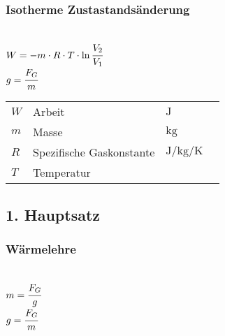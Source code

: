 \documentclass[a4paper, 11pt]{article}
\begin{document}
\subsubsection{Isotherme Zustastandsänderung}
\begin{minipage}{0.45\textwidth}

 \\
$W = -m \cdot R \cdot T \cdot \ln{\cfrac{V_2}{V_1}}$ \\
$g = \cfrac{F_G}{m}$

\end{minipage}
\begin{minipage}{0.45\textwidth}

\begin{tabular}{llll}
$W$ & Arbeit & $\si{\joule}$ & \\
$m$ & Masse & $\si{\kilogram}$ &  \\
$R$ & Spezifische Gaskonstante & $\si{\joule\per\kilogram\per\kelvin} $ & $ $ \\
$T$ & Temperatur & $\si{} $ & \\
\end{tabular}

\end{minipage}

\subsection{1. Hauptsatz}
\subsubsection{Wärmelehre}
\begin{minipage}{0.45\textwidth}

 \\
$m = \cfrac{F_G}{g}$ \\
$g = \cfrac{F_G}{m}$

\end{minipage}
\begin{minipage}{0.45\textwidth}
\noindent{}%
\end{minipage}
\end{document}
